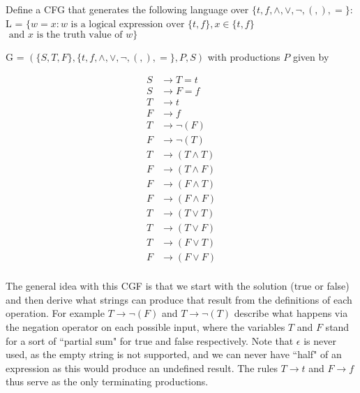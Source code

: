 \documentclass[12pt]{jhwhw}
\begin{document}
\problem{}

	Define a CFG that generates the following language over $\{t,f,\wedge,\vee,\neg,(,),=\}$: \\
	L = $\{w=x : w \text{ is a logical expression over } \{t,f\}, x\in \{t,f\}$
	$\text{ and } x \text{ is the truth value of } w\}$

\solution

	G = $(\{S,T,F\}, \{t,f,\wedge,\vee,\neg,(,),=\}, P, S)$ with productions $P$ given by

	\begin{align*}
		S &\rightarrow T=t \\
		S &\rightarrow F=f \\
		T &\rightarrow t \\
		F &\rightarrow f \\
		T &\rightarrow \neg(F) \\
		F &\rightarrow \neg(T) \\
		T &\rightarrow (T \wedge T) \\
		F &\rightarrow (T \wedge F) \\
		F &\rightarrow (F \wedge T) \\
		F &\rightarrow (F \wedge F) \\
		T &\rightarrow (T \vee T) \\
		T &\rightarrow (T \vee F) \\
		T &\rightarrow (F \vee T) \\
		F &\rightarrow (F \vee F) \\
	\end{align*}

	The general idea with this CGF is that we start with the solution (true or false) and
	then derive what strings can produce that result from the definitions of each operation.
	For example $T\rightarrow \neg(F)$ and $T\rightarrow \neg(T)$ describe what happens
	via the negation operator on each possible input, where the variables $T$ and $F$ stand
	for a sort of ``partial sum" for true and false respectively. Note that $\epsilon$ is 
	never used, as the empty string is not supported, and we can never have ``half" of an
	expression as this would produce an undefined result. The rules $T\rightarrow t$ and
	$F\rightarrow f$ thus serve as the only terminating productions.
\end{document}
